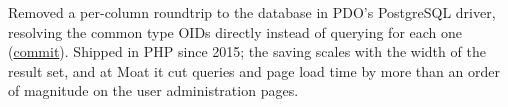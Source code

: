 Removed a per-column roundtrip to the database in PDO's PostgreSQL driver, resolving the common type OIDs directly instead of querying for each one (\href{https://github.com/php/php-src/commit/e10257ba8069fb982d9cd8681f6633de9fea534d}{commit}).
Shipped in PHP since 2015; the saving scales with the width of the result set, and at Moat it cut queries and page load time by more than an order of magnitude on the user administration pages.
